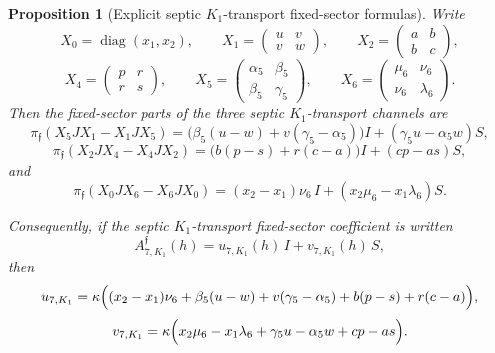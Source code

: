 \documentclass[11pt,a4paper]{amsart}
\theoremstyle{plain}
\newtheorem{proposition}[theorem]{Proposition}
\theoremstyle{definition}
\newcommand{\diag}{\operatorname{diag}}
\begin{document}
\begin{proposition}[Explicit septic $K_1$-transport fixed-sector formulas]
\label{prop:explicit-septic-k1-fixed-sector}
Write
\[
X_0=\diag(x_1,x_2),
\qquad
X_1=
\begin{pmatrix}
u&v\\
v&w
\end{pmatrix},
\qquad
X_2=
\begin{pmatrix}
a&b\\
b&c
\end{pmatrix},
\]
\[
X_4=
\begin{pmatrix}
p&r\\
r&s
\end{pmatrix},
\qquad
X_5=
\begin{pmatrix}
\alpha_5&\beta_5\\
\beta_5&\gamma_5
\end{pmatrix},
\qquad
X_6=
\begin{pmatrix}
\mu_6&\nu_6\\
\nu_6&\lambda_6
\end{pmatrix}.
\]
Then the fixed-sector parts of the three septic $K_1$-transport channels are
\[
\pi_{\mathfrak f}(X_5JX_1-X_1JX_5)
=
\bigl(\beta_5(u-w)+v(\gamma_5-\alpha_5)\bigr)I
+
(\gamma_5u-\alpha_5w)S,
\]
\[
\pi_{\mathfrak f}(X_2JX_4-X_4JX_2)
=
\bigl(b(p-s)+r(c-a)\bigr)I
+
(cp-as)S,
\]
and
\[
\pi_{\mathfrak f}(X_0JX_6-X_6JX_0)
=
(x_2-x_1)\nu_6\,I
+
(x_2\mu_6-x_1\lambda_6)S.
\]

Consequently, if the septic $K_1$-transport fixed-sector coefficient is
written
\[
A_{7,K_1}^{\mathfrak f}(h)=u_{7,K_1}(h)\,I+v_{7,K_1}(h)\,S,
\]
then
\[
u_{7,K_1}
=
\kappa\Bigl(
(x_2-x_1)\nu_6
+
\beta_5(u-w)+v(\gamma_5-\alpha_5)
+
b(p-s)+r(c-a)
\Bigr),
\]
\[
v_{7,K_1}
=
\kappa\Bigl(
x_2\mu_6-x_1\lambda_6
+
\gamma_5u-\alpha_5w
+
cp-as
\Bigr).
\]
\end{proposition}
\end{document}
